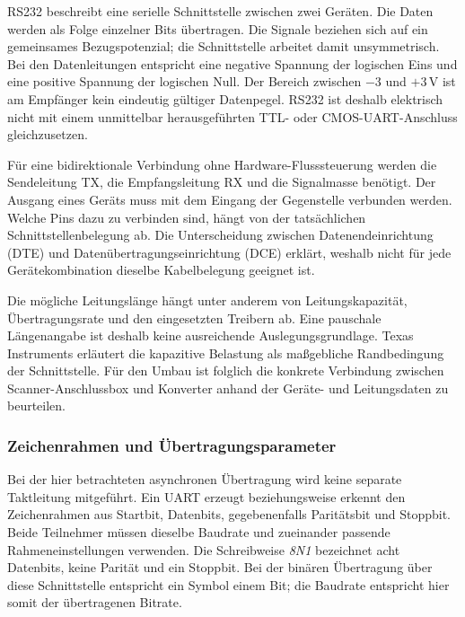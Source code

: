 RS232 beschreibt eine serielle Schnittstelle zwischen zwei Geräten. Die Daten werden als Folge einzelner Bits übertragen. Die Signale beziehen sich auf ein gemeinsames Bezugspotenzial; die Schnittstelle arbeitet damit unsymmetrisch. Bei den Datenleitungen entspricht eine negative Spannung der logischen Eins und eine positive Spannung der logischen Null. Der Bereich zwischen $-3$ und $+3$\,V ist am Empfänger kein eindeutig gültiger Datenpegel. RS232 ist deshalb elektrisch nicht mit einem unmittelbar herausgeführten TTL- oder CMOS-UART-Anschluss gleichzusetzen. \cite[Abschn.~General Information]{ti_rs232_2002}

Für eine bidirektionale Verbindung ohne Hardware-Flusssteuerung werden die Sendeleitung TX, die Empfangsleitung RX und die Signalmasse benötigt. Der Ausgang eines Geräts muss mit dem Eingang der Gegenstelle verbunden werden. Welche Pins dazu zu verbinden sind, hängt von der tatsächlichen Schnittstellenbelegung ab. Die Unterscheidung zwischen Datenendeinrichtung (DTE) und Datenübertragungseinrichtung (DCE) erklärt, weshalb nicht für jede Gerätekombination dieselbe Kabelbelegung geeignet ist. \cite{adi_rs232_2001}

Die mögliche Leitungslänge hängt unter anderem von Leitungskapazität, Übertragungsrate und den eingesetzten Treibern ab. Eine pauschale Längenangabe ist deshalb keine ausreichende Auslegungsgrundlage. Texas Instruments erläutert die kapazitive Belastung als maßgebliche Randbedingung der Schnittstelle. Für den Umbau ist folglich die konkrete Verbindung zwischen Scanner-Anschlussbox und Konverter anhand der Geräte- und Leitungsdaten zu beurteilen. \cite{ti_rs232_2002}

\subsubsection{Zeichenrahmen und Übertragungsparameter}

Bei der hier betrachteten asynchronen Übertragung wird keine separate Taktleitung mitgeführt. Ein UART erzeugt beziehungsweise erkennt den Zeichenrahmen aus Startbit, Datenbits, gegebenenfalls Paritätsbit und Stoppbit. Beide Teilnehmer müssen dieselbe Baudrate und zueinander passende Rahmeneinstellungen verwenden. Die Schreibweise \emph{8N1} bezeichnet acht Datenbits, keine Parität und ein Stoppbit. Bei der binären Übertragung über diese Schnittstelle entspricht ein Symbol einem Bit; die Baudrate entspricht hier somit der übertragenen Bitrate. \cite{adi_rs232_2001}

